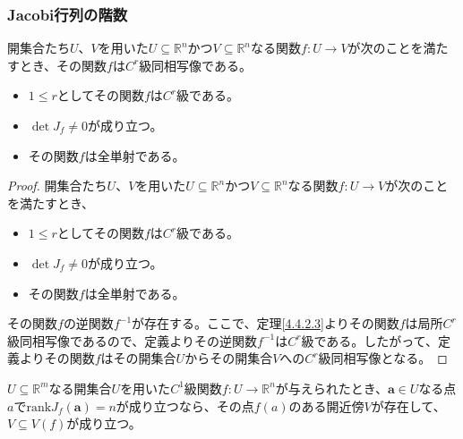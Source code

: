 \documentclass[dvipdfmx]{jsarticle}
\begin{document}
\subsubsection{Jacobi行列の階数}%
\begin{thm}\label{4.4.2.5}
開集合たち$U$、$V$を用いた$U \subseteq \mathbb{R}^{n}$かつ$V \subseteq \mathbb{R}^{n}$なる関数$f:U \rightarrow V$が次のことを満たすとき、その関数$f$は$C^{r}$級同相写像である。
\begin{itemize}
\item
  $1 \leq r$としてその関数$f$は$C^{r}$級である。
\item
  $\det J_{f} \neq 0$が成り立つ。
\item
  その関数$f$は全単射である。
\end{itemize}
\end{thm}
\begin{proof}
開集合たち$U$、$V$を用いた$U \subseteq \mathbb{R}^{n}$かつ$V \subseteq \mathbb{R}^{n}$なる関数$f:U \rightarrow V$が次のことを満たすとき、
\begin{itemize}
\item
  $1 \leq r$としてその関数$f$は$C^{r}$級である。
\item
  $\det J_{f} \neq 0$が成り立つ。
\item
  その関数$f$は全単射である。
\end{itemize}
その関数$f$の逆関数$f^{- 1}$が存在する。ここで、定理\ref{4.4.2.3}よりその関数$f$は局所$C^{r}$級同相写像であるので、定義よりその逆関数$f^{- 1}$は$C^{r}$級である。したがって、定義よりその関数$f$はその開集合$U$からその開集合$V$への$C^{r}$級同相写像となる。
\end{proof}
\begin{thm}\label{4.4.2.6}
$U \subseteq \mathbb{R}^{m}$なる開集合$U$を用いた$C^{1}$級関数$f:U \rightarrow \mathbb{R}^{n}$が与えられたとき、$\mathbf{a} \in U$なる点$a$で$\mathrm{rank}J_{f}\left( \mathbf{a} \right) = n$が成り立つなら、その点$f(a)$のある開近傍$V$が存在して、$V \subseteq V(f)$が成り立つ。
\end{thm}
\end{document}
